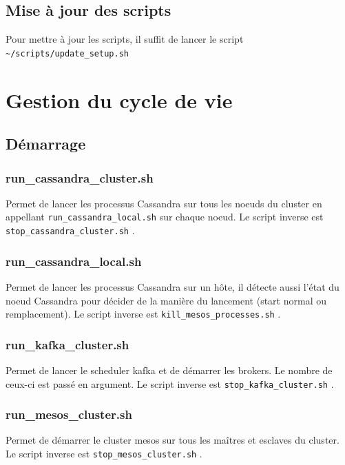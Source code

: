 \documentclass[a4paper, 11pt, titlepage]{article}
\begin{document}
\subsection {Mise à jour des scripts}

Pour mettre à jour les scripts, il suffit de lancer le script \lstinline!~/scripts/update_setup.sh!





\section {Gestion du cycle de vie}

\subsection {Démarrage}

\subsubsection*{run\_cassandra\_cluster.sh}
Permet de lancer les processus Cassandra sur tous les noeuds du cluster en appellant \lstinline!run_cassandra_local.sh! sur chaque noeud.
Le script inverse est \lstinline!stop_cassandra_cluster.sh! .

\subsubsection*{run\_cassandra\_local.sh}
Permet de lancer les processus Cassandra sur un hôte, il détecte aussi l'état du noeud Cassandra pour décider de la manière du lancement (start normal ou remplacement).
Le script inverse est \lstinline!kill_mesos_processes.sh! .

\subsubsection*{run\_kafka\_cluster.sh}
Permet de lancer le scheduler kafka et de démarrer les brokers. Le nombre de ceux-ci est passé en argument.
Le script inverse est \lstinline!stop_kafka_cluster.sh! .

\subsubsection*{run\_mesos\_cluster.sh}
Permet de démarrer le cluster mesos sur tous les maîtres et esclaves du cluster.
Le script inverse est \lstinline!stop_mesos_cluster.sh! .
\end{document}

